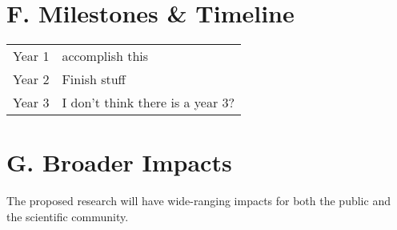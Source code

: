 \section*{F. Milestones \& Timeline}
\begin{tabular}{ll}
Year 1 \hspace{0.5in} & accomplish this\\
Year 2                     & Finish stuff  \\
Year 3		& I don't think there is a year 3?\\
\end{tabular}

\section*{G. Broader Impacts}

The proposed research will have wide-ranging impacts for both the public and the scientific community.

\begin{comment}
Quantitative phenotypes such as yield, plant height, and flowering time are of critical importance to agriculture.  
Deleterious alleles likely play a large role in many of these phenotypes: crop plants have undergone dramatic demographic shifts, usually involving a domestication bottleneck followed by expansion as cultivation spread, and some authors even argue that selection on domestication traits has inadvertently increased the frequency of alleles deleterious for other phenotypes (cite gunther2010). 
Consistent with this hypothesis, my lab has recently shown that genes associated with a number of quantitative traits in maize are enriched for deleterious alleles  compared to randomly chosen genes (cite mezmouk2014).
However, while we know that demography impacts the frequency of individual deleterious variants, we have a poor understanding of the interaction of demography and selection on phenotypic variation. 
In particular, we know little about how these two forces interact to determine the genetic architecture -- the number of genes and their effect -- of a trait. 
Such information is crucial for understanding variation in phenotype, designing breeding strategies, utilizing diversity from wild relatives, or even engineering new traits using biotechnology. 
\jri{see ideas and text in ``service\_award.tex'' that I uploaded too.}
\end{comment}




